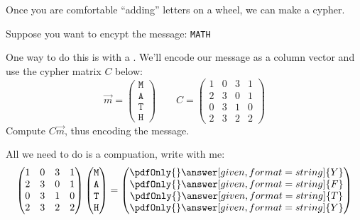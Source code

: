 \documentclass{ximera}
\begin{document}
Once you are comfortable ``adding'' letters on a wheel, we can make a cypher.

\begin{example}[Cryptography]
  Suppose you want to encypt the message: \texttt{MATH}


  One way to do this is with a . We'll encode
  our message as a column vector and use the cypher matrix $C$ below:
  \[
  \vec{m} =
  \begin{pmatrix}
    \texttt M\\
    \texttt A\\
    \texttt T\\
    \texttt H
  \end{pmatrix}
  \qquad
  C= \begin{pmatrix}
 1 & 0 & 3 & 1 \\
 2 & 3 & 0 & 1 \\
 0 & 3 & 1 & 0 \\
 2 & 3 & 2 & 2
  \end{pmatrix}
  \]
 Compute $C\vec{m}$, thus encoding the message.
 \begin{explanation}
   All we need to do is a compuation, write with me:
   \[
   \begin{pmatrix}
 1 & 0 & 3 & 1 \\
 2 & 3 & 0 & 1 \\
 0 & 3 & 1 & 0 \\
 2 & 3 & 2 & 2
   \end{pmatrix}
   \begin{pmatrix}
    \texttt M\\
    \texttt A\\
    \texttt T\\
    \texttt H
   \end{pmatrix}
   =
     \begin{pmatrix}
    \pdfOnly{\tt}\answer[given,format=string]{Y}\\
    \pdfOnly{\tt}\answer[given,format=string]{F}\\
    \pdfOnly{\tt}\answer[given,format=string]{T}\\
    \pdfOnly{\tt}\answer[given,format=string]{Y}
   \end{pmatrix}
   \]
 \end{explanation}
\end{example}
\end{document}
